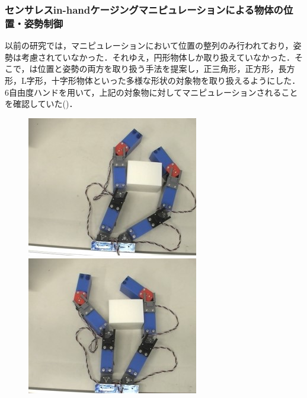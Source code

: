 \documentclass[a4paper,twoside,12pt,papersize, dvipdfmx]{iirthesis}
\begin{document}
\subsubsection{センサレスin-handケージングマニピュレーションによる物体の位置・姿勢制御 \cite{komiyama2021}}
以前の研究\cite{asamura2013}では，マニピュレーションにおいて位置の整列のみ行われており，姿勢は考慮されていなかった．それゆえ，円形物体しか取り扱えていなかった．そこで，\cite{komiyama2021}は位置と姿勢の両方を取り扱う手法を提案し，正三角形，正方形，長方形，L字形，十字形物体といった多様な形状の対象物を取り扱えるようにした．
6自由度ハンドを用いて，上記の対象物に対してマニピュレーションされることを確認していた()．
\begin{figure}[b]
\begin{minipage}{0.24\hsize}
\centering
\includegraphics[width=\hsize]{fig/1-introduction/komiyama/mani1.jpg}
\subcaption{}
\end{minipage}\hfill
\begin{minipage}{0.24\hsize}
\centering
\includegraphics[width=\hsize]{fig/1-introduction/komiyama/mani2.jpg}

\end{minipage}
\end{figure}
\end{document}
